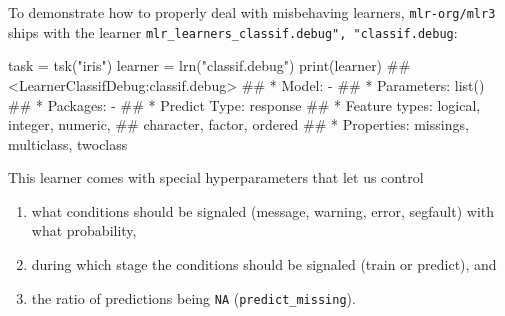 \documentclass[
  11pt,
  parskip=half,
  DIV=calc,
  BCOR=10mm,
  x11names]{scrbook}
\newenvironment{Shaded}{}{}
\newcommand{\KeywordTok}[1]{\textcolor[rgb]{0.00,0.00,1.00}{#1}}
\newcommand{\NormalTok}[1]{#1}
\newcommand{\OperatorTok}[1]{#1}
\newcommand{\StringTok}[1]{\textcolor[rgb]{0.00,0.50,0.50}{#1}}
\providecommand{\tightlist}{%
  \setlength{\itemsep}{0pt}\setlength{\parskip}{0pt}}
\begin{document}
To demonstrate how to properly deal with misbehaving learners, \texttt{mlr-org/mlr3} ships with the learner \texttt{mlr\_learners\_classif.debug",\ "classif.debug}:

\begin{Shaded}
\begin{Highlighting}[]
\NormalTok{task =}\StringTok{ }\KeywordTok{tsk}\NormalTok{(}\StringTok{"iris"}\NormalTok{)}
\NormalTok{learner =}\StringTok{ }\KeywordTok{lrn}\NormalTok{(}\StringTok{"classif.debug"}\NormalTok{)}
\KeywordTok{print}\NormalTok{(learner)}
\NormalTok{## <LearnerClassifDebug:classif.debug>}
\NormalTok{## * Model: -}
\NormalTok{## * Parameters: list()}
\NormalTok{## * Packages: -}
\NormalTok{## * Predict Type: response}
\NormalTok{## * Feature types: logical, integer, numeric,}
\NormalTok{##   character, factor, ordered}
\NormalTok{## * Properties: missings, multiclass, twoclass}
\end{Highlighting}
\end{Shaded}

This learner comes with special hyperparameters that let us control

\begin{enumerate}
\def\labelenumi{\arabic{enumi}.}
\tightlist
\item
  what conditions should be signaled (message, warning, error, segfault) with what probability,
\item
  during which stage the conditions should be signaled (train or predict), and
\item
  the ratio of predictions being \texttt{NA} (\texttt{predict\_missing}).
\end{enumerate}

\begin{Shaded}
\end{Shaded}
\end{document}
